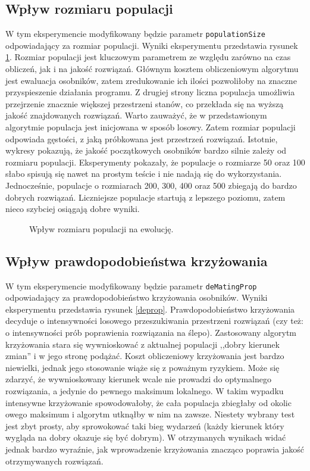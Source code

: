 \documentclass[a4paper,12pt,leqno]{article}
\begin{document}
\subsection{Wpływ rozmiaru populacji}
W tym eksperymencie modyfikowany będzie parametr \texttt{populationSize} odpowiadający za rozmiar populacji. Wyniki eksperymentu przedstawia
rysunek \ref{popsize}. Rozmiar populacji jest kluczowym parametrem ze względu zarówno na czas obliczeń, jak i na jakość rozwiązań. Głównym kosztem
obliczeniowym algorytmu jest ewaluacja osobników, zatem zredukowanie ich ilości pozwoliłoby na znaczne przyspieszenie działania programu. Z drugiej
strony liczna populacja umożliwia przejrzenie znacznie większej przestrzeni stanów, co przekłada się na wyższą jakość znajdowanych rozwiązań.
Warto zauważyć, że w przedstawionym algorytmie populacja jest inicjowana w sposób losowy. Zatem rozmiar populacji odpowiada gęstości, z jaką 
próbkowana jest przestrzeń rozwiązań. Istotnie, wykresy pokazują, że jakość początkowych osobników bardzo silnie zależy od rozmiaru populacji.
Eksperymenty pokazały, że populacje o rozmiarze 50 oraz 100 słabo spisują się nawet na prostym teście i nie nadają się do wykorzystania.
Jednocześnie, populacje o rozmiarach 200, 300, 400 oraz 500 zbiegają do bardzo dobrych rozwiązań. Liczniejsze populacje startują z lepszego
poziomu, zatem nieco szybciej osiągają dobre wyniki.

\begin{figure}\centering
\footnotesize\vspace{-2em}
\normalsize\caption{Wpływ rozmiaru populacji na ewolucję.}\label{popsize}
\end{figure}

\subsection{Wpływ prawdopodobieństwa krzyżowania}
W tym eksperymencie modyfikowany będzie parametr \texttt{deMatingProp} odpowiadający za prawdopodobieństwo krzyżowania osobników. Wyniki eksperymentu
przedstawia rysunek \ref{deprop}. Prawdopodobieństwo krzyżowania decyduje o intensywności losowego przeszukiwania przestrzeni rozwiązań (czy też:
o intensywności prób poprawienia rozwiązania na ślepo). Zastosowany algorytm krzyżowania stara się wywnioskować z aktualnej populacji ,,dobry
kierunek zmian'' i w jego stronę podążać. Koszt obliczeniowy krzyżowania jest bardzo niewielki, jednak jego stosowanie wiąże się z poważnym
ryzykiem. Może się zdarzyć, że wywnioskowany kierunek wcale nie prowadzi do optymalnego rozwiązania, a jedynie do pewnego maksimum lokalnego.
W takim wypadku intensywne krzyżowanie spowodowałoby, że cała populacja zbiegłaby od okolic owego maksimum i algorytm utknąłby w nim na zawsze.
Niestety wybrany test jest zbyt prosty, aby sprowokować taki bieg wydarzeń (każdy kierunek który wygląda na dobry okazuje się być dobrym).
W otrzymanych wynikach widać jednak bardzo wyraźnie, jak wprowadzenie krzyżowania znacząco poprawia jakość otrzymywanych rozwiązań.
\end{document}
